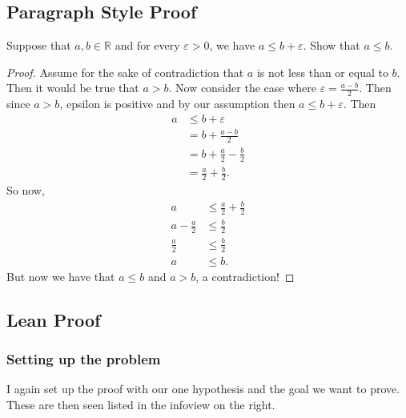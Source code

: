 \documentclass[
  letterpaper,
]{scrreprt}
\newcommand{\excl}[1]{}
\theoremstyle{remark}
\begin{document}
\hypertarget{paragraph-style-proof-1}{%
\subsection{Paragraph Style Proof}\label{paragraph-style-proof-1}}

\begin{thm}
Suppose that \(a, b \in \mathbb{R}\) and for every \(\varepsilon > 0\),
we have \(a \le b + \varepsilon\). Show that \(a \le b\).

\end{thm}

\begin{proof}

Assume for the sake of contradiction that \(a\) is not less than or
equal to \(b\). Then it would be true that \(a > b\). Now consider the
case where \(\varepsilon = \frac{a - b}{2}.\) Then since \(a > b\),
epsilon is positive and by our assumption then
\(a \le b + \varepsilon\). Then \begin{align*}
a & \le b + \varepsilon \\
& = b + \frac{a - b}{2} \\
& = b + \frac{a}{2} - \frac{b}{2} \\
& = \frac{a}{2} + \frac{b}{2}. 
\end{align*} So now, \begin{align*}
a & \le \frac{a}{2} + \frac{b}{2} \\
a - \frac{a}{2} & \le \frac{b}{2} \\
\frac{a}{2} & \le \frac{b}{2} \\
a & \le b.
\end{align*} But now we have that \(a \le b\) and \(a > b\), a
contradiction! \excl{~□}\qedhere

\end{proof}

\hypertarget{lean-proof-1}{%
\subsection{Lean Proof}\label{lean-proof-1}}

\hypertarget{setting-up-the-problem}{%
\subsubsection{Setting up the problem}\label{setting-up-the-problem}}

I again set up the proof with our one hypothesis and the goal we want to
prove. These are then seen listed in the infoview on the right.
\end{document}
